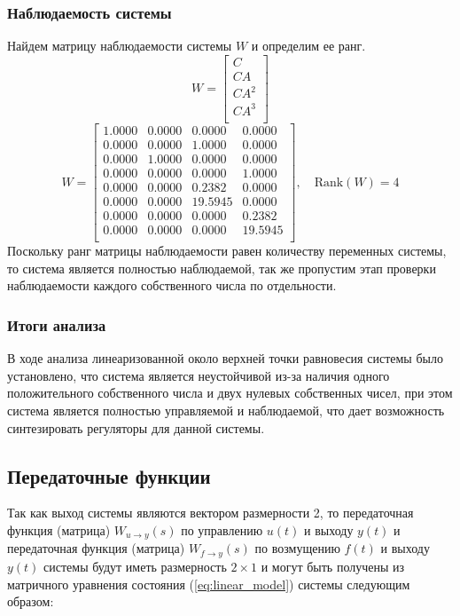 \subsubsection{Наблюдаемость системы}
Найдем матрицу наблюдаемости системы $W$ и определим ее ранг.
\begin{equation}
    W = \begin{bmatrix}
    C \\ 
    CA \\ 
    CA^2 \\ 
    CA^3 \\ 
    \end{bmatrix}
\end{equation}
\begin{equation}
   W = \begin{bmatrix}
    1.0000  & 0.0000  & 0.0000  & 0.0000 \\ 
    0.0000  & 0.0000  & 1.0000  & 0.0000 \\ 
    0.0000  & 1.0000  & 0.0000  & 0.0000 \\ 
    0.0000  & 0.0000  & 0.0000  & 1.0000 \\ 
    0.0000  & 0.0000  & 0.2382  & 0.0000 \\ 
    0.0000  & 0.0000  & 19.5945  & 0.0000 \\ 
    0.0000  & 0.0000  & 0.0000  & 0.2382 \\ 
    0.0000  & 0.0000  & 0.0000  & 19.5945 \\
    \end{bmatrix}, \quad \text{Rank}(W) = 4
    \label{eq:observability_matrix}
\end{equation}
Поскольку ранг матрицы наблюдаемости равен количеству переменных системы, то система является полностью наблюдаемой, так же 
пропустим этап проверки наблюдаемости каждого собственного числа по отдельности. 

\subsubsection{Итоги анализа}
В ходе анализа линеаризованной около верхней точки равновесия системы было установлено, что система является
неустойчивой из-за наличия одного положительного собственного числа и двух нулевых собственных чисел, при этом 
система является полностью управляемой и наблюдаемой, что дает возможность синтезировать регуляторы для 
данной системы. 

\subsection{Передаточные функции}
Так как выход системы являются вектором размерности 2, то передаточная функция (матрица) $W_{u\rightarrow y}(s)$ по 
управлению $u(t)$ и выходу $y(t)$ и передаточная функция (матрица) $W_{f\rightarrow y}(s)$ по 
возмущению $f(t)$ и выходу $y(t)$ системы будут иметь размерность $2 \times 1$ и могут быть получены из матричного уравнения состояния
(\ref{eq:linear_model}) системы следующим образом:

